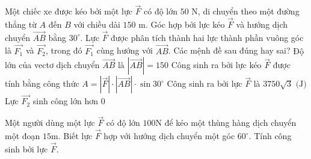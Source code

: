 \begin{ex}%
	Một chiếc xe được kéo bởi một lực $\overrightarrow{F}$ có độ lớn $50\text{ N}$, di chuyển theo một đường thẳng từ $A$ đến $B$ với chiều dài $150\text{ m}$. Góc hợp bởi lực kéo $\overrightarrow{F}$ và hướng dịch chuyển $\overrightarrow{AB}$ bằng $30^\circ$. Lực $\overrightarrow{F}$ được phân tích thành hai lực thành phần vuông góc là $\overrightarrow{F_1}$ và $\overrightarrow{F_2}$, trong đó $\overrightarrow{F_1}$ cùng hướng với $\overrightarrow{AB}$. Các mệnh đề sau đúng hay sai?
	\choiceTF
	{\True Độ lớn của vectơ dịch chuyển $\overrightarrow{AB}$ là $|\overrightarrow{AB}| = 150$}
	{Công sinh ra bởi lực kéo $\overrightarrow{F}$ được tính bằng công thức $A = |\overrightarrow{F}| \cdot |\overrightarrow{AB}| \cdot \sin 30^\circ$}
	{\True Công sinh ra bởi lực $\overrightarrow{F}$ là $3750\sqrt{3}\text{ (J)}$}
	{Lực $\overrightarrow{F_2}$ sinh công lớn hơn $0$}
\end{ex}

\begin{bt}%
Một người dùng một lực $\overrightarrow{F}$ có độ lớn $100 $N để kéo một thùng hàng dịch chuyển một đoạn $15$m. Biết lực $\overrightarrow{F}$ hợp với hướng dịch chuyển một góc $60^{\circ}$. Tính công sinh bởi lực $\overrightarrow{F}$.
\end{bt}

